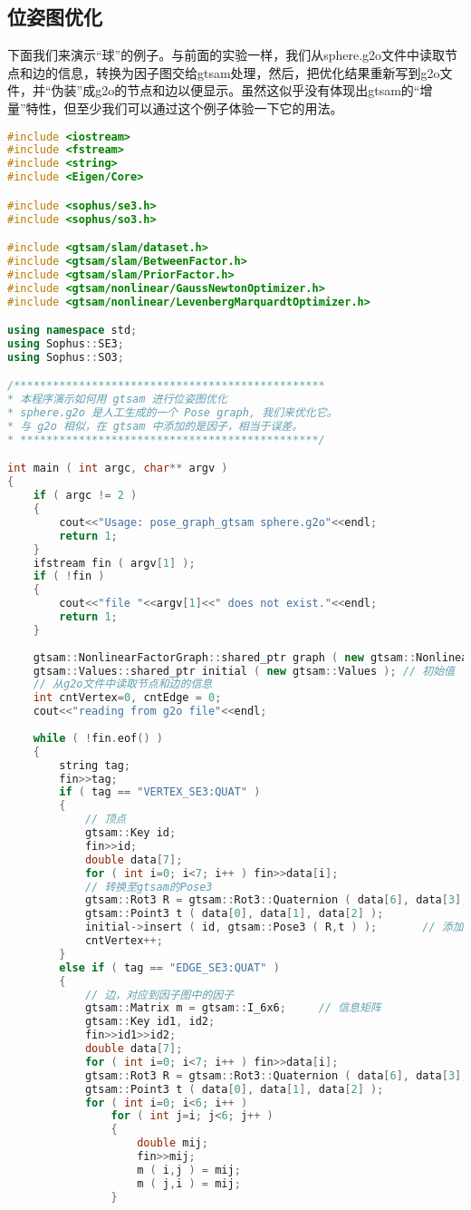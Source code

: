 \subsection{位姿图优化}
下面我们来演示“球”的例子。与前面的实验一样，我们从sphere.g2o文件中读取节点和边的信息，转换为因子图交给gtsam处理，然后，把优化结果重新写到g2o文件，并“伪装”成g2o的节点和边以便显示。虽然这似乎没有体现出gtsam的“增量”特性，但至少我们可以通过这个例子体验一下它的用法。

\begin{lstlisting}[language=c++,caption=slambook/ch11/pose\_graph\_gtsam.cpp]
#include <iostream>
#include <fstream>
#include <string>
#include <Eigen/Core>

#include <sophus/se3.h>
#include <sophus/so3.h>

#include <gtsam/slam/dataset.h>
#include <gtsam/slam/BetweenFactor.h>
#include <gtsam/slam/PriorFactor.h>
#include <gtsam/nonlinear/GaussNewtonOptimizer.h>
#include <gtsam/nonlinear/LevenbergMarquardtOptimizer.h>

using namespace std;
using Sophus::SE3;
using Sophus::SO3;

/************************************************
* 本程序演示如何用 gtsam 进行位姿图优化
* sphere.g2o 是人工生成的一个 Pose graph, 我们来优化它。
* 与 g2o 相似，在 gtsam 中添加的是因子，相当于误差。
* **********************************************/

int main ( int argc, char** argv )
{
	if ( argc != 2 )
	{
		cout<<"Usage: pose_graph_gtsam sphere.g2o"<<endl;
		return 1;
	}
	ifstream fin ( argv[1] );
	if ( !fin )
	{
		cout<<"file "<<argv[1]<<" does not exist."<<endl;
		return 1;
	}
	
	gtsam::NonlinearFactorGraph::shared_ptr graph ( new gtsam::NonlinearFactorGraph );  // gtsam的因子图
	gtsam::Values::shared_ptr initial ( new gtsam::Values ); // 初始值
	// 从g2o文件中读取节点和边的信息
	int cntVertex=0, cntEdge = 0;
	cout<<"reading from g2o file"<<endl;
	
	while ( !fin.eof() )
	{
		string tag;
		fin>>tag;
		if ( tag == "VERTEX_SE3:QUAT" )
		{
			// 顶点
			gtsam::Key id;
			fin>>id;
			double data[7];
			for ( int i=0; i<7; i++ ) fin>>data[i];
			// 转换至gtsam的Pose3
			gtsam::Rot3 R = gtsam::Rot3::Quaternion ( data[6], data[3], data[4], data[5] );
			gtsam::Point3 t ( data[0], data[1], data[2] );
			initial->insert ( id, gtsam::Pose3 ( R,t ) );       // 添加初始值
			cntVertex++;
		}
		else if ( tag == "EDGE_SE3:QUAT" )
		{
			// 边，对应到因子图中的因子
			gtsam::Matrix m = gtsam::I_6x6;     // 信息矩阵
			gtsam::Key id1, id2;
			fin>>id1>>id2;
			double data[7];
			for ( int i=0; i<7; i++ ) fin>>data[i];
			gtsam::Rot3 R = gtsam::Rot3::Quaternion ( data[6], data[3], data[4], data[5] );
			gtsam::Point3 t ( data[0], data[1], data[2] );
			for ( int i=0; i<6; i++ )
				for ( int j=i; j<6; j++ )
				{
					double mij;
					fin>>mij;
					m ( i,j ) = mij;
					m ( j,i ) = mij;
				}
		

\end{lstlisting}
